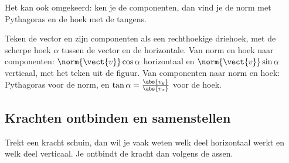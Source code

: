 Het kan ook omgekeerd: ken je de componenten, dan vind je de norm met Pythagoras en de hoek met de tangens.


\begin{werkwijze}
Teken de vector en zijn componenten als een rechthoekige driehoek, met de scherpe hoek $\alpha$ tussen de vector en de horizontale. Van norm en hoek naar componenten: $\norm{\vect{v}}\cos\alpha$ horizontaal en $\norm{\vect{v}}\sin\alpha$ verticaal, met het teken uit de figuur. Van componenten naar norm en hoek: Pythagoras voor de norm, en $\tan\alpha = \tfrac{\abs{v_y}}{\abs{v_x}}$ voor de hoek.
\end{werkwijze}

\begin{oefeningen}
\end{oefeningen}

\subsection{Krachten ontbinden en samenstellen}

Trekt een kracht schuin, dan wil je vaak weten welk deel horizontaal werkt en welk deel verticaal. Je ontbindt de kracht dan volgens de assen.


